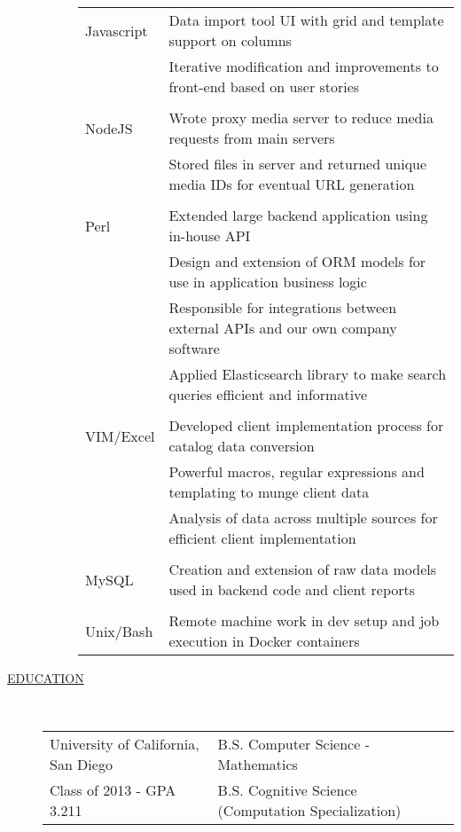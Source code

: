 \documentclass[12pt]{article}
\begin{document}
\begin{description}
\begin{description}
                \begin{tabular}{l|l}
                    Javascript & Data import tool UI with grid and template support on columns\\
                               & Iterative modification and improvements to front-end based on user stories\\
                                 \\
                    NodeJS     & Wrote proxy media server to reduce media requests from main servers \\
                               & Stored files in server and returned unique media IDs for eventual URL generation\\
                                 \\
                    Perl   & Extended large backend application using in-house API \\
                               & Design and extension of ORM models for use in application business logic \\
                               & Responsible for integrations between external APIs and our own company software \\
                               & Applied Elasticsearch library to make search queries efficient and informative\\
                                 \\
                    VIM/Excel  & Developed client implementation process for catalog data conversion\\
                               & Powerful macros, regular expressions and templating to munge client data\\
                               & Analysis of data across multiple sources for efficient client implementation\\
                                 \\
                    MySQL      & Creation and extension of raw data models used in backend code and client reports\\
                                 \\
                    Unix/Bash  & Remote machine work in dev setup and job execution in Docker containers\\
                \end{tabular}

		\end{description}

    \item[\underline{EDUCATION}]  \hfill \\
        \begin{tabular}{l|l}
            University of California, San Diego & B.S. Computer Science - Mathematics \\
            \hfill Class of 2013 - GPA 3.211    & B.S. Cognitive Science (Computation Specialization)\\
		\end{tabular}


\end{description}
\end{document}
